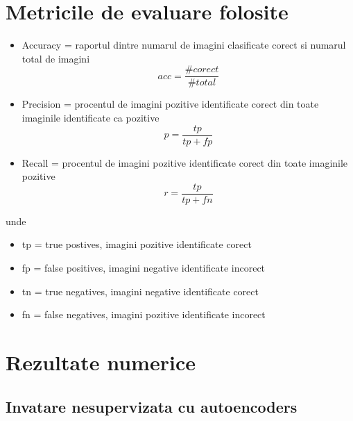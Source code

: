 \documentclass{article}
\begin{document}
\section{Metricile de evaluare folosite}
\begin{itemize}
  \item Accuracy = raportul dintre numarul de imagini clasificate corect si numarul total de imagini
	\begin{equation*}
	acc = \frac{\#corect}{\#total}
	\end{equation*}
  \item Precision = procentul de imagini pozitive identificate corect din toate imaginile identificate ca pozitive
	\begin{equation*}
	p = \frac{tp}{tp + fp}
	\end{equation*}
  \item Recall = procentul de imagini pozitive identificate corect din toate imaginile pozitive
	\begin{equation*}
	r = \frac{tp}{tp + fn}
	\end{equation*}
\end{itemize}
unde 
\begin{itemize}
  \item tp = true postives, imagini pozitive identificate corect
  \item fp = false positives, imagini negative identificate incorect
  \item tn = true negatives, imagini negative identificate corect
  \item fn = false negatives, imagini pozitive identificate incorect
\end{itemize}

\section{Rezultate numerice}

\subsection{Invatare nesupervizata cu autoencoders}
\end{document}
